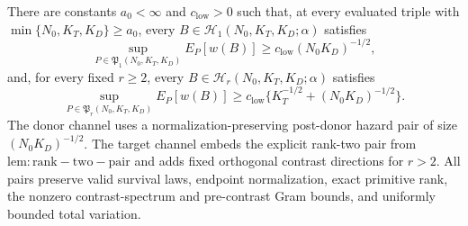 There are constants \(a_0<\infty\) and \(c_{\mathrm{low}}>0\) such that, at every evaluated triple with \(\min\{N_0,K_T,K_D\}\ge a_0\), every \(B\in\mathcal H_1(N_0,K_T,K_D;\alpha)\) satisfies \[\sup_{P\in\mathfrak P_1(N_0,K_T,K_D)}E_P[w(B)]\ge c_{\mathrm{low}}(N_0K_D)^{-1/2},\] and, for every fixed \(r\ge2\), every \(B\in\mathcal H_r(N_0,K_T,K_D;\alpha)\) satisfies \[\sup_{P\in\mathfrak P_r(N_0,K_T,K_D)}E_P[w(B)]\ge c_{\mathrm{low}}\{K_T^{-1/2}+(N_0K_D)^{-1/2}\}.\] The donor channel uses a normalization-preserving post-donor hazard pair of size \((N_0K_D)^{-1/2}\). The target channel embeds the explicit rank-two pair from \(\mathrm{lem:rank-two-pair}\) and adds fixed orthogonal contrast directions for \(r>2\). All pairs preserve valid survival laws, endpoint normalization, exact primitive rank, the nonzero contrast-spectrum and pre-contrast Gram bounds, and uniformly bounded total variation.